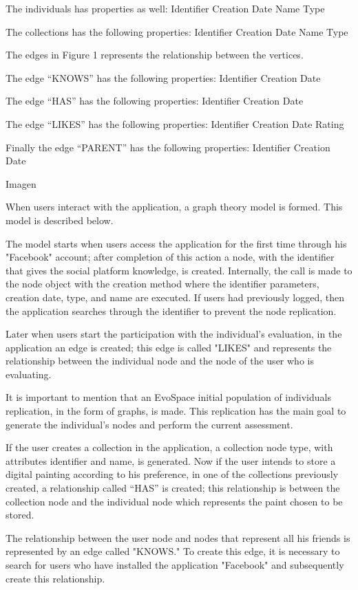 The  individuals has properties as well: Identifier Creation Date Name Type

The collections has the following properties: Identifier Creation Date Name Type


The edges in Figure 1 represents the relationship between the vertices.

The edge “KNOWS” has the following properties: Identifier Creation Date

The edge “HAS” has the following properties: Identifier Creation Date

The edge “LIKES” has the following properties: Identifier Creation Date Rating

Finally the edge “PARENT” has the following properties: Identifier Creation Date

Imagen


When users interact with the application, a graph theory model is formed. This
model is described below.

The model starts when users access the application for the first time through
his "Facebook" account; after completion of this action a node, with the
identifier that gives the social platform knowledge, is created. Internally, the
call is made to the node object with the creation method where the identifier
parameters, creation date, type, and name are executed.  If users had previously
logged, then the application searches through the identifier to prevent the node
replication.

Later when users start the participation with the individual's evaluation, in
the application an edge is created; this edge is called "LIKES" and represents
the relationship between the individual node and the node of the user who is
evaluating.

It is important to mention that an EvoSpace initial population of individuals
replication, in the form of graphs, is made. This replication has the main goal
to generate the individual's nodes and perform the current assessment.

If the user creates a collection in the application, a collection node type,
with attributes identifier and name, is generated. Now if the user intends to
store a digital painting according to his preference, in one of the collections
previously created, a relationship called “HAS” is created; this relationship is
between the collection node and the individual node which represents the paint
chosen to be stored.

The relationship between the user node and nodes that represent all his friends
is represented by an edge called "KNOWS." To create this edge, it is necessary
to search for users who have installed the application "Facebook" and
subsequently create this relationship.

